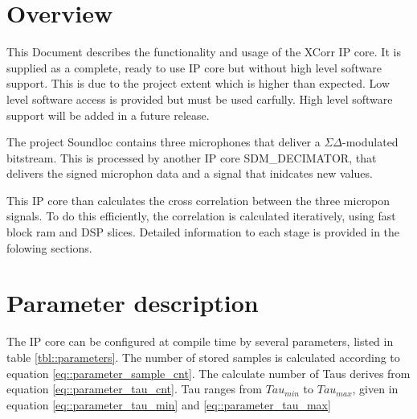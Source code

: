 


\maketitle


\section{Overview}
\label{sec:overview}

This Document describes the functionality and usage of the XCorr IP core.
It is supplied as a complete, ready to use IP core but without high level software support.
This is due to the project extent which is higher than expected.
Low level software access is provided but must be used carfully.
High level software support will be added in a future release.

The project Soundloc contains three microphones that deliver a $\Sigma\Delta$-modulated bitstream.
This is processed by another IP core SDM\_DECIMATOR, that delivers the signed microphon data and a signal that inidcates new values.

This IP core than calculates the cross correlation between the three micropon signals.
To do this efficiently, the correlation is calculated iteratively, using fast block ram and DSP slices.
Detailed information to each stage is provided in the folowing sections.

\section{Parameter description}
\label{sec::parameters}

The IP core can be configured at compile time by several parameters, listed in table \ref{tbl::parameters}.
The number of stored samples is calculated according to equation \ref{eq::parameter_sample_cnt}.
The calculate number of Taus derives from equation \ref{eq::parameter_tau_cnt}.
Tau ranges from $Tau_{min}$ to $Tau_{max}$, given in equation \ref{eq::parameter_tau_min} and \ref{eq::parameter_tau_max}

